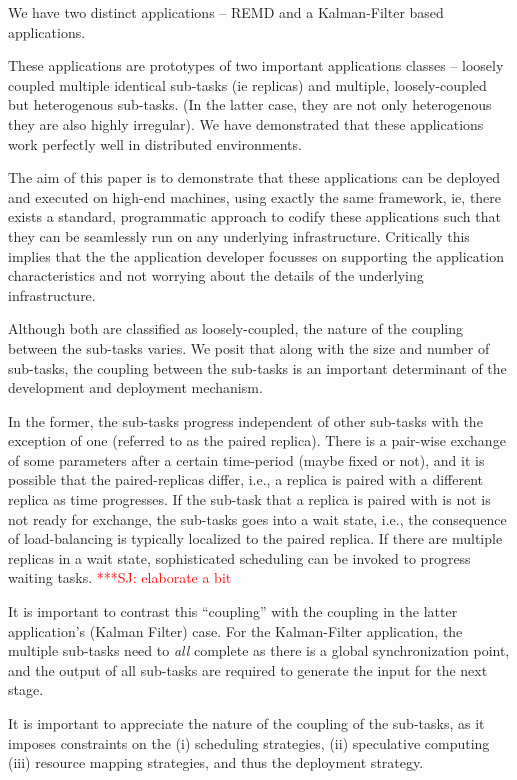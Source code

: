 \documentclass[conference,final]{IEEEtran}
\newcommand{\jhanote}[1]{ {\textcolor{red} { ***SJ: #1 }}}
\newcommand{\jhanote}[1]{}
\begin{document}
We have two distinct applications -- REMD and a Kalman-Filter based
applications.

These applications are prototypes of two important applications
classes -- loosely coupled multiple identical sub-tasks (ie replicas)
and multiple, loosely-coupled but heterogenous sub-tasks.  (In the
latter case, they are not only heterogenous they are also highly
irregular).  We have demonstrated that these applications work
perfectly well in distributed environments.

The aim of this paper is to demonstrate that these applications can be
deployed and executed on high-end machines, using exactly the same
framework, ie, there exists a standard, programmatic approach to
codify these applications such that they can be seamlessly run on any
underlying infrastructure. Critically this implies that the the
application developer focusses on supporting the application
characteristics and not worrying about the details of the underlying
infrastructure.

Although both are classified as loosely-coupled, the nature of the
coupling between the sub-tasks varies. We posit that along with the
size and number of sub-tasks, the coupling between the sub-tasks is an
important determinant of the development and deployment mechanism.



In the former, the sub-tasks
progress independent of other sub-tasks with the exception of one
(referred to as the paired replica). There is a pair-wise exchange of
some parameters after a certain time-period (maybe fixed or not), and
it is possible that the paired-replicas differ, i.e., a replica is
paired with a different replica as time progresses. If the sub-task
that a replica is paired with is not is not ready for exchange, the
sub-tasks goes into a wait state, i.e., the consequence of
load-balancing is typically localized to the paired replica. If there
are multiple replicas in a wait state, sophisticated scheduling can be
invoked to progress waiting tasks. \jhanote{elaborate a bit}

It is important to contrast this ``coupling'' with the coupling in the
latter application's (Kalman Filter) case. For the Kalman-Filter
application, the multiple sub-tasks need to {\it all} complete
as there is a global synchronization point, and the output
of all sub-tasks are required to generate the input for the next
stage.

It is important to appreciate the nature of the coupling of the
sub-tasks, as it imposes constraints on the (i) scheduling strategies,
(ii) speculative computing (iii) resource mapping strategies, and thus
the deployment strategy.
\end{document}
